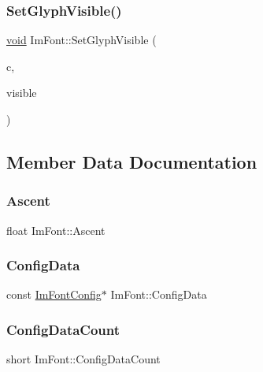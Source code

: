 \subsubsection{\texorpdfstring{Set\+Glyph\+Visible()}{SetGlyphVisible()}}
{\footnotesize\ttfamily \hyperlink{imgui__impl__opengl3__loader_8h_ac668e7cffd9e2e9cfee428b9b2f34fa7}{void} Im\+Font\+::\+Set\+Glyph\+Visible (\begin{DoxyParamCaption}\item[{Im\+Wchar}]{c,  }\item[{bool}]{visible }\end{DoxyParamCaption})}



\subsection{Member Data Documentation}
\mbox{\label{structImFont_a5238ef18f8ad02b783fb8b3a195b708e}} 
\subsubsection{\texorpdfstring{Ascent}{Ascent}}
{\footnotesize\ttfamily float Im\+Font\+::\+Ascent}

\mbox{\label{structImFont_afff4a317b215a37599589941d6131fd0}} 
\subsubsection{\texorpdfstring{Config\+Data}{ConfigData}}
{\footnotesize\ttfamily const \hyperlink{structImFontConfig}{Im\+Font\+Config}$\ast$ Im\+Font\+::\+Config\+Data}

\mbox{\label{structImFont_a4a30fc7711d628ad582ccb3188a51ddd}} 
\subsubsection{\texorpdfstring{Config\+Data\+Count}{ConfigDataCount}}
{\footnotesize\ttfamily short Im\+Font\+::\+Config\+Data\+Count}

